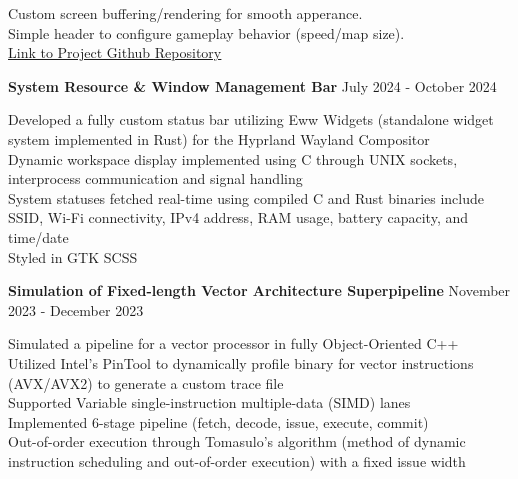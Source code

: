 \documentclass[letter,12pt]{article}
\begin{document}
\textbullet \- Custom screen buffering/rendering for smooth
apperance.\\
\textbullet \- Simple header to configure gameplay behavior (speed/map size).\\
\textbullet \- {\color{cyan}\underline{\href{https://github.com/DMGDy/termios-snake}{Link to Project Github Repository}}}\\
\begin{tcolorbox}
[colback=gray!25,
  leftrule=0pt,
  rightrule=0pt,
  sharp corners]
\noindent\textbf{System Resource \& Window Management Bar}
\hfill July 2024 - October 2024
\end{tcolorbox}
\noindent
\textbullet \- Developed a fully custom status bar utilizing Eww Widgets 
(standalone widget system implemented in Rust) for the Hyprland Wayland 
Compositor\\
\textbullet \- Dynamic workspace display implemented using C through UNIX sockets, interprocess 
communication and signal handling\\
\textbullet \- System statuses fetched real-time using compiled C and Rust binaries include
SSID, Wi-Fi connectivity, IPv4 address, RAM usage, battery capacity, and time/date\\
\textbullet \- Styled in GTK SCSS \\
\textbullet \- \href{https://github.com/DMGDy/eww-bar}
{}

\vspace{-.125cm}
\begin{tcolorbox}
[colback=gray!25,
  leftrule=0pt,
  rightrule=0pt,
  sharp corners]
\noindent\textbf{Simulation of Fixed-length Vector Architecture Superpipeline}
\hfill November 2023 - December 2023
\end{tcolorbox}
\noindent
\textbullet \- Simulated a pipeline for a vector processor in fully Object-Oriented C++\\
\textbullet \- Utilized Intel's PinTool to dynamically profile binary for vector instructions (AVX/AVX2) to generate a custom trace file\\
\textbullet \- Supported Variable single-instruction multiple-data (SIMD) lanes\\
\textbullet \- Implemented 6-stage pipeline (fetch, decode, issue, execute, commit)\\
\textbullet \- Out-of-order execution through Tomasulo's algorithm (method of dynamic
instruction scheduling and out-of-order execution)
with a fixed issue width\\
\end{document}
